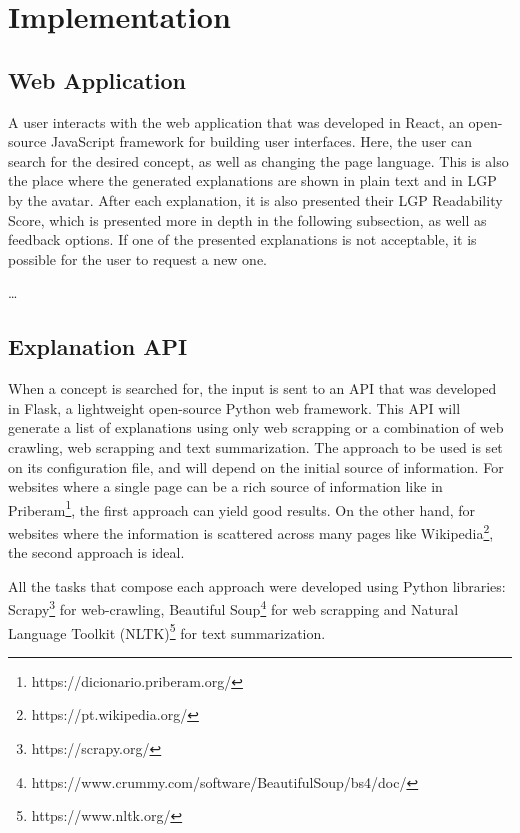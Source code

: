 
\chapter{Implementation} %
\label{chap:Chapter5}

\section{Web Application}

A user interacts with the web application that was developed in React, an open-source JavaScript framework for building user interfaces.
Here, the user can search for the desired concept, as well as changing the page language.
This is also the place where the generated explanations are shown in plain text and in LGP by the avatar.
After each explanation, it is also presented their LGP Readability Score, which is presented more in depth in the following subsection, as well as feedback options.
If one of the presented explanations is not acceptable, it is possible for the user to request a new one.

\dots %

\section{Explanation API}

When a concept is searched for, the input is sent to an API that was developed in Flask, a lightweight open-source Python web framework.
This API will generate a list of explanations using only web scrapping or a combination of web crawling, web scrapping and text summarization.
The approach to be used is set on its configuration file, and will depend on the initial source of information.
For websites where a single page can be a rich source of information like in Priberam\footnote{https://dicionario.priberam.org/}, the first approach can yield good results.
On the other hand, for websites where the information is scattered across many pages like Wikipedia\footnote{https://pt.wikipedia.org/}, the second approach is ideal.

All the tasks that compose each approach were developed using Python libraries: Scrapy\footnote{https://scrapy.org/} for web-crawling, Beautiful Soup\footnote{https://www.crummy.com/software/BeautifulSoup/bs4/doc/} for web scrapping and Natural Language Toolkit (NLTK)\footnote{https://www.nltk.org/} for text summarization.

